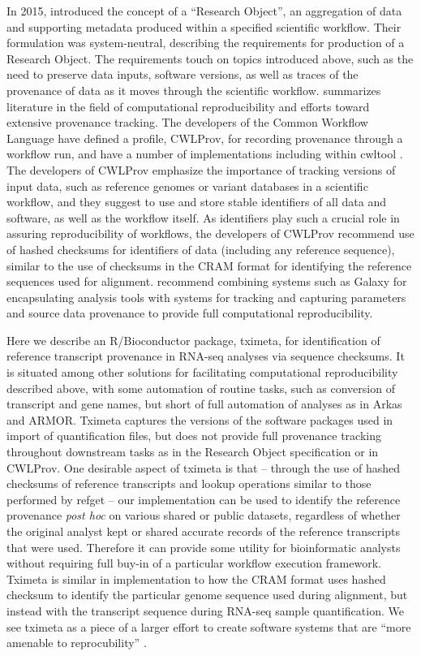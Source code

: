 \documentclass[12pt]{article} \usepackage[utf8]{inputenc}
\begin{document}
In 2015, \citet{Belhajjame2015} introduced the concept of a ``Research
Object'', an aggregation of data and supporting metadata produced
within a specified scientific workflow. Their formulation was
system-neutral, describing the requirements for production of a
Research Object. The requirements touch on topics introduced above,
such as the need to preserve data inputs, software versions, as well
as traces of the provenance of data as it moves through the scientific
workflow. \citet{Belhajjame2015} summarizes literature in the field of
computational reproducibility and efforts toward extensive provenance
tracking. The developers of the Common Workflow Language \citep{cwl}
have defined a profile, CWLProv, for recording provenance through a
workflow run, and have a number of implementations including within
cwltool \citep{Khan2018}. The developers of CWLProv emphasize the
importance of tracking versions of input data, such as reference
genomes or variant databases in a scientific workflow, and they
suggest to use and store stable identifiers of all data and software,
as well as the workflow itself. As identifiers play such a crucial
role in assuring reproducibility of workflows, the developers of
CWLProv recommend use of hashed checksums for identifiers of data
(including any reference sequence), similar to the use of checksums in
the CRAM format for identifying the reference sequences used for
alignment. \citet{Gruning2018} recommend combining systems such as
Galaxy for encapsulating analysis tools with systems for tracking and
capturing parameters and source data provenance to provide full
computational reproducibility.

Here we describe an R/Bioconductor package, tximeta, for identification
of reference transcript provenance in RNA-seq analyses via sequence
checksums. It is situated among other solutions for facilitating
computational reproducibility described above, with some automation of
routine tasks, such as conversion of transcript and gene names, but
short of full automation of analyses as in Arkas and ARMOR. Tximeta
captures the versions of the software packages used in import of
quantification files, but does not provide full provenance tracking
throughout downstream tasks as in the Research Object specification or
in CWLProv. One desirable aspect of tximeta is that -- through the use
of hashed checksums of reference transcripts and lookup operations
similar to those performed by refget -- our implementation can be used
to identify the reference provenance \textit{post hoc} on various
shared or public datasets, regardless of whether the original analyst
kept or shared accurate records of the reference transcripts that were
used. Therefore it can provide some utility for bioinformatic analysts
without requiring full buy-in of a particular workflow execution
framework. Tximeta is similar in implementation to how the CRAM format
uses hashed checksum to identify the particular genome sequence used
during alignment, but instead with the transcript sequence during
RNA-seq sample quantification. We see tximeta as a piece of a larger
effort to create software systems that are ``more amenable to
reprocubility'' \citep{Peng2011}.
\end{document}
